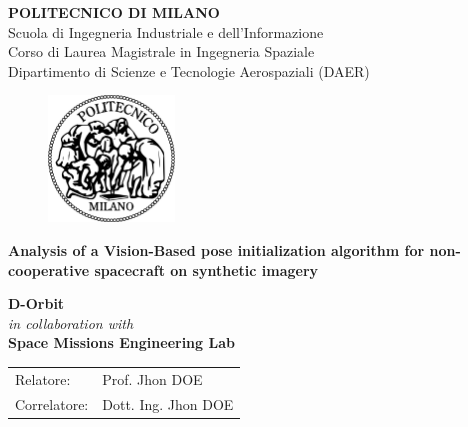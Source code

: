 \begin{titlepage}

\begin{center}
\Large\textbf{{\textsc{POLITECNICO DI MILANO}}}\\
\Large{Scuola di Ingegneria Industriale e dell'Informazione}\\
\large{Corso di Laurea Magistrale in Ingegneria Spaziale}\\
\large{Dipartimento di Scienze e Tecnologie Aerospaziali (DAER)}
\par\end{center}

\vspace{0.5cm}

\begin{center}
\begin{figure}[h]
\centering{}\includegraphics[width=0.3\textwidth]{title-page/logo-polimi}
\end{figure}
\vspace{0.5cm}
\par\end{center}

\begin{center}
\textbf{\LARGE{Analysis of a Vision-Based pose initialization algorithm for non-cooperative spacecraft on synthetic imagery}}\vspace{0.5cm}
\vspace{0.2cm}
\par\end{center}

\begin{center}
\textbf{D-Orbit}\\
\textit{in collaboration with}\\
\textbf{Space Missions Engineering Lab}
\end{center}\vspace{1.5cm}

\begin{flushleft}
\begin{tabular}{ll}
Relatore:  & Prof. Jhon DOE\tabularnewline
Correlatore: & Dott. Ing. Jhon DOE\tabularnewline
\end{tabular}\vspace{1.8cm}
\par\end{flushleft}


\end{titlepage}
